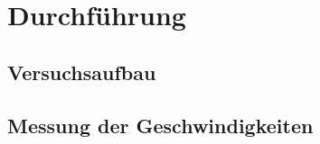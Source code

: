 \section{Durchführung}
\label{sec:Durchführung}

\subsection{Versuchsaufbau}

\subsection{Messung der Geschwindigkeiten}

